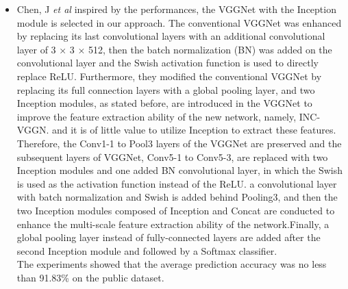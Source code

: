 \begin{itemize}
    \item Chen, J \textit{et al} \cite{art35} inspired by the performances, the VGGNet with the Inception module is selected in our approach. The conventional VGGNet was enhanced by replacing its last convolutional layers with an additional convolutional layer of 3 × 3 × 512, then the batch normalization (BN) was added on the convolutional layer and the Swish activation function is used to directly replace ReLU. Furthermore, they modified the conventional VGGNet by replacing its full connection layers with a global pooling layer, and two Inception modules, as stated before, are introduced in the VGGNet to improve the feature extraction ability of the new network, namely, INC-VGGN. and it is of little value to utilize Inception to extract these features. Therefore, the Conv1-1 to Pool3 layers of the VGGNet are preserved and the subsequent layers of VGGNet, Conv5-1 to Conv5-3, are replaced with two Inception modules and one added BN convolutional layer, in which the Swish is used as the activation function instead of the ReLU. a convolutional layer with batch normalization and Swish is added behind Pooling3, and then the two Inception modules composed of Inception and Concat are conducted to enhance the multi-scale feature extraction ability of the network.Finally, a global pooling layer instead of fully-connected layers are added after the second Inception module and followed by a Softmax classifier.\\
    The experiments showed that the average prediction accuracy was no less than 91.83\% on the public dataset.


\end{itemize}
